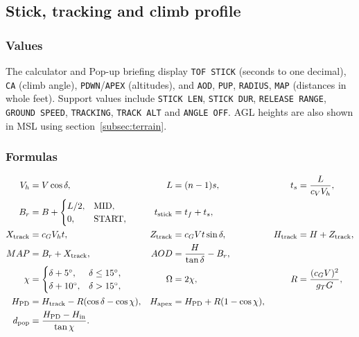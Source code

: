 \documentclass[10pt,a4paper]{amsart}
\begin{document}
\subsection{Stick, tracking and climb profile}\label{subsec:popup-profile}
\subsubsection*{Values}
The calculator and Pop-up briefing display \texttt{TOF STICK} (seconds
to one decimal), \texttt{CA} (climb angle), \texttt{PDWN}/\texttt{APEX}
(altitudes), and \texttt{AOD}, \texttt{PUP}, \texttt{RADIUS}, \texttt{MAP}
(distances in whole feet). Support values include \texttt{STICK LEN},
\texttt{STICK DUR}, \texttt{RELEASE RANGE}, \texttt{GROUND SPEED},
\texttt{TRACKING}, \texttt{TRACK ALT} and \texttt{ANGLE OFF}.
AGL heights are also shown in MSL using section~\ref{subsec:terrain}.

\subsubsection*{Formulas}
\begin{align*}
 V_h&=V\cos\delta,& L&=(n-1)s,& t_s&=\frac{L}{c_VV_h},\\
 B_r&=B+\begin{cases}L/2,&\text{MID},\\0,&\text{START},\end{cases}&
 t_{\rm stick}&=t_f+t_s,\\
 X_{\rm track}&=c_GV_ht,& Z_{\rm track}&=c_GVt\sin\delta,&
 H_{\rm track}&=H+Z_{\rm track},\\
 MAP&=B_r+X_{\rm track},&
 AOD&=\frac{H}{\tan\delta}-B_r,\\
 \chi&=\begin{cases}\delta+5^\circ,&\delta\leq15^\circ,\\
                      \delta+10^\circ,&\delta>15^\circ,\end{cases}&
 \Omega&=2\chi,& R&=\frac{(c_GV)^2}{g_TG},\\
 H_{\rm PD}&=H_{\rm track}-R(\cos\delta-\cos\chi),&
 H_{\rm apex}&=H_{\rm PD}+R(1-\cos\chi),\\
 d_{\rm pop}&=\frac{H_{\rm PD}-H_{\rm in}}{\tan\chi}.
\end{align*}
\end{document}
